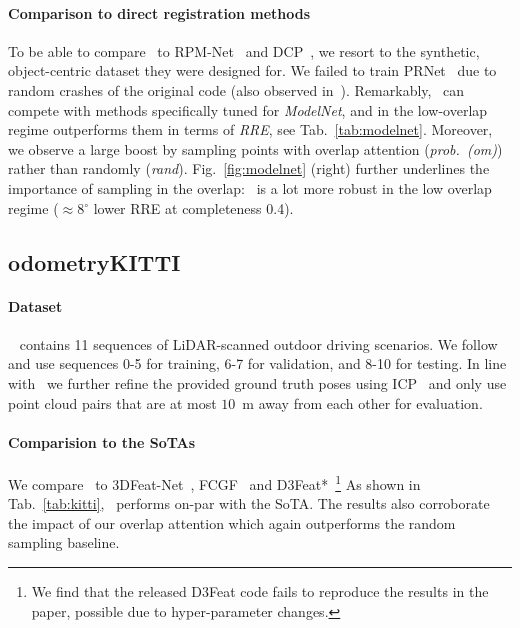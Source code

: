 
\paragraph{Comparison to direct registration methods}
To be able to compare \acro\ to RPM-Net~\cite{yew2020rpm} and DCP~\cite{wang2019dcp}, we resort to the synthetic, object-centric dataset they were designed for. We failed to train PRNet~\cite{wang2019prnet} due to random crashes of the original code (also observed in~\cite{choy2020deep}).
Remarkably, \acro\ can compete with methods specifically tuned for \emph{ModelNet}, and in the low-overlap regime outperforms them in terms of \emph{RRE}, see Tab.~\ref{tab:modelnet}.
Moreover, we observe a large boost by sampling points with overlap attention (\emph{prob.\ (om)}) rather than randomly (\emph{rand}).
Fig.~\ref{fig:modelnet} (right) further underlines the importance of sampling in the overlap: \acro\ is a lot more robust in the low overlap regime ($\approx$8$^\circ$ lower RRE at completeness 0.4). 

\subsection{odometryKITTI}
\label{sec:kitti}
\paragraph{Dataset}
~\cite{geiger2012kitti} contains 11 sequences of LiDAR-scanned outdoor driving scenarios. We follow ~\cite{Choy2019FCGF} and use sequences 0-5 for training, 6-7 for validation, and 8-10 for testing. In line with~\cite{Choy2019FCGF, bai2020d3feat} we further refine the provided ground truth poses using ICP~\cite{besl1992method} and only use point cloud pairs that are at most $10$~m away from each other for evaluation.


\paragraph{Comparision to the SoTAs}
We compare \acro\ to 3DFeat-Net~\cite{yew20183dfeat}, FCGF~\cite{Choy2019FCGF} and D3Feat*~\cite{bai2020d3feat}\footnote{We find that the released D3Feat code fails to reproduce the results in the paper, possible due to hyper-parameter changes.}
As shown in Tab.~\ref{tab:kitti}, \acro\ performs on-par with the SoTA. The results also corroborate the impact of our overlap attention %
which again outperforms the random sampling baseline.

